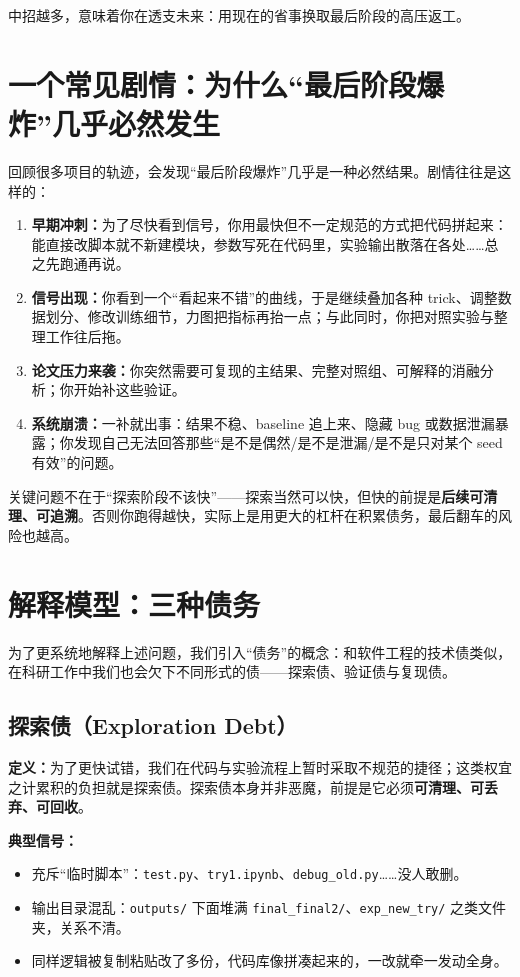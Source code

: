中招越多，意味着你在透支未来：用现在的省事换取最后阶段的高压返工。

\section{一个常见剧情：为什么“最后阶段爆炸”几乎必然发生}
回顾很多项目的轨迹，会发现“最后阶段爆炸”几乎是一种必然结果。剧情往往是这样的：
\begin{enumerate}
  \item \textbf{早期冲刺：}为了尽快看到信号，你用最快但不一定规范的方式把代码拼起来：能直接改脚本就不新建模块，参数写死在代码里，实验输出散落在各处……总之先跑通再说。
  \item \textbf{信号出现：}你看到一个“看起来不错”的曲线，于是继续叠加各种 trick、调整数据划分、修改训练细节，力图把指标再抬一点；与此同时，你把对照实验与整理工作往后拖。
  \item \textbf{论文压力来袭：}你突然需要可复现的主结果、完整对照组、可解释的消融分析；你开始补这些验证。
  \item \textbf{系统崩溃：}一补就出事：结果不稳、baseline 追上来、隐藏 bug 或数据泄漏暴露；你发现自己无法回答那些“是不是偶然/是不是泄漏/是不是只对某个 seed 有效”的问题。
\end{enumerate}

关键问题不在于“探索阶段不该快”——探索当然可以快，但快的前提是\textbf{后续可清理、可追溯}。否则你跑得越快，实际上是用更大的杠杆在积累债务，最后翻车的风险也越高。

\section{解释模型：三种债务}
为了更系统地解释上述问题，我们引入“债务”的概念：和软件工程的技术债类似，在科研工作中我们也会欠下不同形式的债——探索债、验证债与复现债。

\subsection{探索债（Exploration Debt）}
\textbf{定义：}为了更快试错，我们在代码与实验流程上暂时采取不规范的捷径；这类权宜之计累积的负担就是探索债。探索债本身并非恶魔，前提是它必须\textbf{可清理、可丢弃、可回收}。

\textbf{典型信号：}
\begin{itemize}
  \item 充斥“临时脚本”：\texttt{test.py}、\texttt{try1.ipynb}、\texttt{debug\_old.py}……没人敢删。
  \item 输出目录混乱：\texttt{outputs/} 下面堆满 \texttt{final\_final2/}、\texttt{exp\_new\_try/} 之类文件夹，关系不清。
  \item 同样逻辑被复制粘贴改了多份，代码库像拼凑起来的，一改就牵一发动全身。
\end{itemize}

